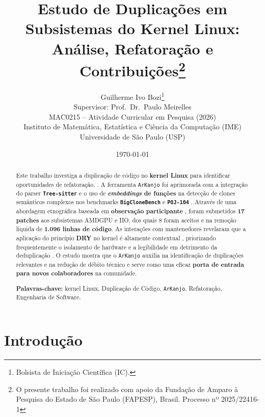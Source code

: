 \documentclass[twocolumn]{article}
\title{Estudo de Duplicações em Subsistemas do Kernel Linux: Análise, Refatoração e Contribuições\thanks{O presente trabalho foi realizado com apoio da Fundação de Amparo à Pesquisa do Estado de São Paulo (FAPESP), Brasil. Processo nº 2025/22416-1}}
\author{Guilherme Ivo Bozi\thanks{Bolsista de Iniciação Científica (IC).} \\
\small{Supervisor: Prof.\ Dr.\ Paulo Meirelles} \\
\small{MAC0215 -- Atividade Curricular em Pesquisa (2026)} \\
\small{Instituto de Matemática, Estatística e Ciência da Computação (IME)} \\
\small{Universidade de São Paulo (USP)}}
\date{\today}
\begin{document}
\onecolumn

\maketitle
\begin{abstract}

\noindent Este trabalho investiga a duplicação de código no \textbf{kernel Linux} para identificar oportunidades de refatoração. \cite{Alves2013, Corbet2017}. A ferramenta \texttt{ArKanjo} \cite{arcanjo2025arkanjo} foi aprimorada com a integração do parser \textbf{\texttt{Tree-sitter}} e o uso de \textbf{\textit{embeddings} de funções} na detecção de clones semânticos complexos nos benchmarks \textbf{\texttt{BigCloneBench}} \cite{svajlenko2014bigclonebench} e \textbf{\texttt{POJ-104}} \cite{mou2016convolutional}. Através de uma abordagem etnográfica baseada em \textbf{observação participante} \cite{Seaman2008, Robson2016, Wen2021}, foram submetidos \textbf{17 patches} aos subsistemas AMDGPU e IIO, dos quais 8 foram aceitos e na remoção líquida de \textbf{1.096 linhas de código}. As interações com mantenedores revelaram que a aplicação do princípio \textbf{DRY} no kernel é altamente contextual \cite{duplicationdry}, priorizando frequentemente o isolamento de hardware e a legibilidade em detrimento da deduplicação \cite{Wang2011, arcanjotese}. O estudo mostra que o \texttt{ArKanjo} auxilia na identificação de duplicações relevantes e na redução de débito técnico e serve como uma eficaz \textbf{porta de entrada para novos colaboradores} na comunidade.

\vspace{0.5cm}
\noindent\textbf{Palavras-chave:} kernel Linux, Duplicação de Código, \texttt{ArKanjo}, Refatoração, Engenharia de Software.

\end{abstract}



\onecolumn
\newpage

\tableofcontents

\newpage
\twocolumn

\section{Introdução}
\end{document}
